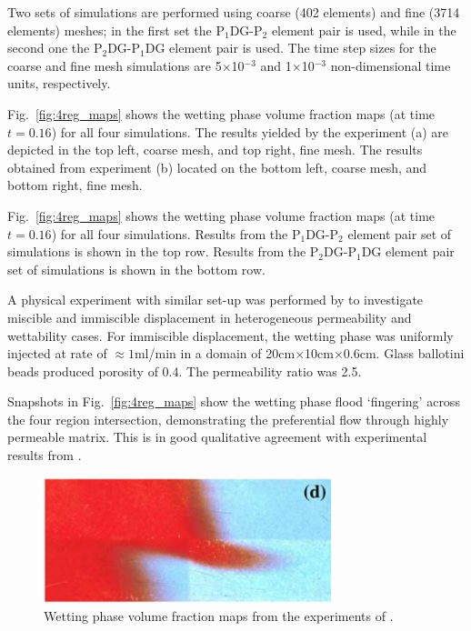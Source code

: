 \documentclass[preprint,authoryear,12pt]{elsarticle}
\newcommand{\PN}[2][error]{P$_{#1}$DG-P$_{#2}$}
\begin{document}
Two sets of simulations are performed using coarse (402 elements) and
fine (3714 elements) meshes; in the first set the \PN[1]{2} element
pair is used, while in the second one the \PN[2]{1}DG element pair is
used. The time step sizes for the coarse and fine mesh simulations are
5$\times$10$^{-3}$ and 1$\times$10$^{-3}$ non-dimensional time units,
respectively.

Fig.~\ref{fig:4reg_maps} shows the wetting phase volume fraction
maps (at time $t=0.16$) for all four simulations. The results yielded
by the experiment (a) are depicted in the top left, coarse mesh, and
top right, fine mesh. The results obtained from experiment (b) located
on the bottom left, coarse mesh, and bottom right, fine mesh.

Fig.~\ref{fig:4reg_maps} shows the wetting phase volume fraction maps
(at time $t=0.16$) for all four simulations. Results from the
\PN[1]{2} element pair set of simulations is shown in the top row.
Results from the \PN[2]{1}DG element pair set of simulations is shown
in the bottom row.

A physical experiment with similar set-up was performed by
\citet{dawe_2008} to investigate miscible and immiscible displacement
in heterogeneous permeability and wettability cases. For immiscible
displacement, the wetting phase was uniformly injected at rate of
$\approx 1$ml/min in a domain of 20cm$\times$10cm$\times$0.6cm. Glass
ballotini beads produced porosity of 0.4. The permeability ratio was
2.5.

Snapshots in Fig.~\ref{fig:4reg_maps} show the wetting phase flood
`fingering' across the four region intersection, demonstrating the
preferential flow through highly permeable matrix. This is in good
qualitative agreement with experimental results from \cite{dawe_2008}
\citep[see Fig.~\ref{fig:dawe_real} taken from ][]{dawe_2008}.

\begin{figure}[h!]
  \begin{center}
    \includegraphics[width=0.75\textwidth]{Real_quadrant}
    \caption{Wetting phase volume fraction maps from the experiments
      of \cite{dawe_2008}. \label{fig:dawe_real}}
  \end{center}
\end{figure}
\end{document}
